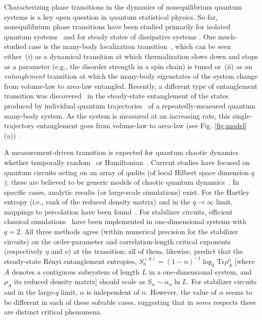 \documentclass[prl,twocolumn,aps,showpacs,amsmath,amssymb,superscriptaddress,floatfix,longbibliography]{revtex4-1}
\begin{document}
Characterizing phase transitions in the dynamics of nonequilibrium quantum systems is a key open question in quantum statistical physics. So far, nonequilibrium phase transitions have been studied primarily for isolated quantum systems~\cite{polkovnikov_review, nhreview} and for steady states of dissipative systems \cite{opensystemsbook,Sieberer16}.  One much-studied case is the many-body localization transition~\cite{nhreview}, which can be seen either~(i) as a dynamical transition at which thermalization slows down and stops as a parameter (e.g., the disorder strength in a spin chain) is tuned or~(ii) as an \emph{entanglement} transition at which the many-body eigenstates of the system change from volume-law to area-law entangled.  Recently, a different type of entanglement transition was discovered~\cite{Vasseur2018,Skinner2019, LCF2018} in the steady-state entanglement of the states produced by individual quantum trajectories~\cite{Zoller87,mcd,CarmichaelBook,Plenio98} of a repeatedly-measured quantum many-body system.  As the system is measured at an increasing rate, this single-trajectory entanglement goes from volume-law to area-law (see Fig. \ref{fig:model}(a))~\cite{Skinner2019, LCF2018, ChoiBaoQiAltman2019,Gullans2019,BaoChoiAltman2019,Szyniszewski2019,LCF2019,Ludwig2019,ChanNandkishore2019}. 

A measurement-driven transition is expected for quantum chaotic dynamics whether temporally random~\cite{Skinner2019, LCF2018} or Hamiltonian~\cite{Tang2019}.  Current studies have focused on quantum circuits acting on an array of qudits (of local Hilbert space dimension $q$); these are believed to be generic models of chaotic quantum dynamics~\cite{nrvh,rpv,Keyserlingk2017,Khemani2017,Rakovszky2018,Chan-2018,Chang-2018}.  
In specific cases, analytic results (or large-scale simulations) exist. For the Hartley entropy (i.e., rank of the reduced density matrix) and in the $q \rightarrow \infty$ limit, mappings to percolation have been found~\cite{Skinner2019, Vasseur2018,Ludwig2019,BaoChoiAltman2019}.
For stabilizer circuits, efficient classical simulations~\cite{LCF2018, LCF2019,Gullans2019,Gullans2019b} have been implemented in one-dimensional systems with $q=2$.  All three methods agree (within numerical precision for the stabilizer circuits) on the order-parameter and correlation-length critical exponents (respectively $\eta$ and $\nu$) at the transition; all of them, likewise, predict that the steady-state R\'enyi entanglement entropies, $S_n^{(A)} = (1 - n)^{-1} \log_2 \mathrm{Tr} \rho_A^n$ [where $A$ denotes a contiguous subsystem of length $L$ in a one-dimensional system, and $\rho_A$ its reduced density matrix]  should scale as $S_n \sim \alpha_n \ln L$. For stabilizer circuits and in the large-$q$ limit, $\alpha$ is independent of $n$. However, the value of $\alpha$ seems to be different in each of these solvable cases, suggesting that in \emph{some} respects these are distinct critical phenomena.
\end{document}
